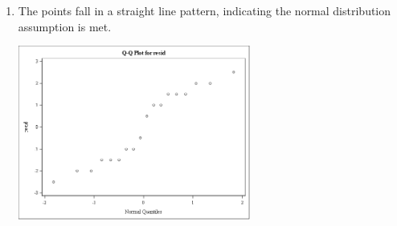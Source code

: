 \documentclass{article}
\begin{document}
\begin{enumerate}[leftmargin = 0 em, label = \arabic*., font = \bfseries]
\begin{enumerate}
\newpage
\item 
The points fall in a straight line pattern, indicating the normal distribution assumption is met.

\begin{center}
\includegraphics[width=0.6\textwidth]{qqnormal.png}
\end{center}
\end{enumerate}
\end{enumerate}
	
	
\end{document}
